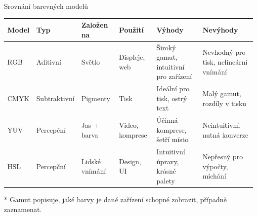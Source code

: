 \documentclass[aspectratio=169,xcolor=dvipsnames, t]{beamer}
\begin{document}
{\begin{frame}{Srovnání barevných modelů}
    \centering
    \footnotesize %
    \begin{tabularx}{\textwidth}{l l l l X X}
        \toprule
        \textbf{Model} & \textbf{Typ} & \textbf{Založen na} & \textbf{Použití} & \textbf{Výhody} & \textbf{Nevýhody} \\
        \midrule
        RGB  & Aditivní   & Světlo         & Displeje, web      & Široký gamut, intuitivní pro zařízení & Nevhodný pro tisk, nelineární vnímání \\
        CMYK & Subtraktivní & Pigmenty     & Tisk               & Ideální pro tisk, ostrý text          & Malý gamut, rozdíly v tisku \\
        YUV  & Percepční  & Jas + barva    & Video, komprese    & Účinná komprese, šetří místo          & Neintuitivní, nutná konverze \\
        HSL  & Percepční  & Lidské vnímání & Design, UI         & Intuitivní úpravy, krásné palety      & Nepřesný pro výpočty, míchání \\
        \bottomrule
    \end{tabularx}
    
    * Gamut popisuje, jaké barvy je dané zařízení schopné zobrazit, případně zaznamenat.
\end{frame}
}

\makefinalpage
\end{document}
